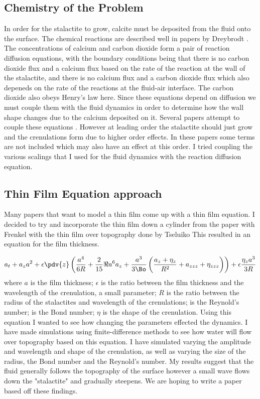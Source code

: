 \documentclass[12pt]{article}
\begin{document}
\subsection{Chemistry of the Problem}
In order for the stalactite to grow, calcite must be deposited from the fluid onto the surface. The chemical reactions are described well in papers by Dreybrodt \cite{formation}. The concentrations of calcium and carbon dioxide form a pair of  reaction diffusion equations, with the boundary conditions being that there is no carbon dioxide flux and a calcium flux based on the rate of the reaction at the wall of the stalactite, and there is no calcium flux and a carbon dioxide flux which also depeneds on the rate of the reactions at the fluid-air interface.  The carbon dioxide also obeys Henry's law here. Since these equations depend on diffusion we must couple them with the fluid dynamics in order to determine how the wall shape changes due to the calcium deposited on it.
Several papers attempt to couple these equations \cite{short,camporeale_2017}. However at leading order the stalactite should just grow and the crenulations form due to higher order effects. In these papers some terms are not included which may also have an effect at this order. I tried coupling the various scalings that I used for the fluid dynamics with the reaction diffusion equation.




\subsection{Thin Film Equation approach}
Many papers that want to model a thin film come up with a thin film equation. I decided to try and incorporate the thin film down a cylinder from the paper with Frenkel \cite{Frenkel_1992} with the thin film over topography done by Tseluiko \cite{tseluiko_blyth_papageorgiou_2013}
This resulted in an equation for the film thickness.

\begin{align}
a_t + a_z a^2  +\epsilon\pdv{z}\left(\frac{a^4}{6R}+\frac{2}{15}\Re a^6a_z+ \frac{a^3}{3\Bo}\left(\frac{a_z+\eta_z}{R^2}+a_{zzz}+\eta_{zzz}\right)\right) + \epsilon\frac{\eta_z a^3}{3R}\label{walldyn}
\end{align}
where $a$ is the film thickness; $\epsilon$ is the ratio between the film thickness and the wavelength of the crenulation, a small parameter; $R$ is the ratio between the radius of the stalactites and wavelength of the crenulations; is the Reynold's number;  is the Bond number; $\eta$ is the shape of the crenulation.
Using this equation I wanted to see how changing the parameters effected the dynamics. I have made simulations using finite-difference methods to see how water will flow over topography based on this equation. I have simulated varying the amplitude and wavelength and shape of the crenulation, as well as varying the size of the radius, the Bond number and the Reynold's number. My results suggest that the fluid generally follows the topography of the surface however a small wave flows down the "stalactite" and gradually steepens. We are hoping to write a paper based off these findings.
\end{document}
